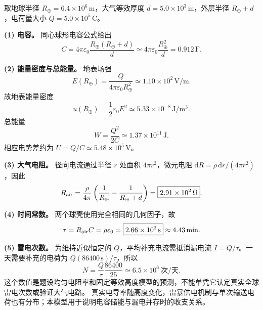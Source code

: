 \begin{xesolution}
取地球半径 $R_\oplus=6.4\times10^6\,\mathrm m$，大气等效厚度
$d=5.0\times10^3\,\mathrm m$，外层半径 $R_\oplus+d$，电荷量大小
$Q=5.0\times10^5\,\mathrm C$。

\textbf{(1) 电容。} 同心球形电容公式给出
\[
 C=4\pi\varepsilon_0\frac{R_\oplus(R_\oplus+d)}d
 \simeq4\pi\varepsilon_0\frac{R_\oplus^2}{d}
 =\boxed{0.912\,\mathrm F}.
\]

\textbf{(2) 能量密度与总能量。} 地表场强
\[
 E(R_\oplus)=\frac{Q}{4\pi\varepsilon_0R_\oplus^2}
 \simeq1.10\times10^2\,\mathrm{V/m}.
\]
故地表能量密度
\[
 \boxed{u(R_\oplus)=\frac12\varepsilon_0E^2
 \simeq5.33\times10^{-8}\,\mathrm{J/m^3}}.
\]
总能量
\[
 \boxed{W=\frac{Q^2}{2C}\simeq1.37\times10^{11}\,\mathrm J}.
\]
相应电势差约为 $U=Q/C\simeq5.48\times10^5\,\mathrm V$。

\textbf{(3) 大气电阻。} 径向电流通过半径 $r$ 处面积 $4\pi r^2$，微元电阻
$\mathrm dR=\rho\,\mathrm dr/(4\pi r^2)$，因此
\[
 R_{\rm air}=\frac\rho{4\pi}
 \left(\frac1{R_\oplus}-\frac1{R_\oplus+d}\right)
 =\boxed{2.91\times10^2\,\Omega}.
\]

\textbf{(4) 时间常数。} 两个球壳使用完全相同的几何因子，故
\[
 \tau=R_{\rm air}C=\rho\varepsilon_0
 =\boxed{2.66\times10^2\,\mathrm s}\approx4.43\,\mathrm{min}.
\]

\textbf{(5) 雷电次数。} 为维持近似恒定的 $Q$，平均补充电流需抵消漏电流
$I=Q/\tau$。一天需要补充的电荷为 $Q(86400\,\mathrm s)/\tau$，所以
\[
 N=\frac{Q}{\tau}\frac{86400}{25}
 \simeq\boxed{6.5\times10^6\ \text{次/天}}.
\]
这个数值是题设均匀电阻率和固定等效高度模型的预测，不能单凭它认定真实全球雷电次数或验证大气电路。
真实电导率随高度变化，雷暴供电机制与单次输送电荷也有分布；本模型用于说明电容储能与漏电并存时的收支关系。
\end{xesolution}
